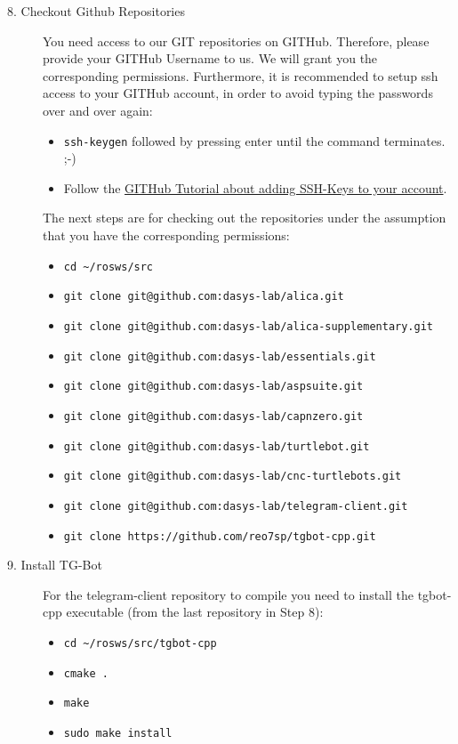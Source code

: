 \begin{description}
\begin{itemize}
	\end{itemize}
	\item[8. Checkout Github Repositories] You need access to our GIT repositories on GITHub. Therefore, please provide your GITHub Username to us. We will grant you the corresponding permissions. Furthermore, it is recommended to setup ssh access to your GITHub account, in order to avoid typing the passwords over and over again:
	\begin{itemize}
		\item \verb#ssh-keygen# followed by pressing enter until the command terminates. ;-)
		\item Follow the \href{https://help.github.com/articles/adding-a-new-ssh-key-to-your-github-account/}{GITHub Tutorial about adding SSH-Keys to your account}.
	\end{itemize}
	The next steps are for checking out the repositories under the assumption that you have the corresponding permissions:
	\begin{itemize}
		\item \verb#cd ~/rosws/src#
		\item \verb#git clone git@github.com:dasys-lab/alica.git#
		\item \verb#git clone git@github.com:dasys-lab/alica-supplementary.git#
		\item \verb#git clone git@github.com:dasys-lab/essentials.git#
		\item \verb#git clone git@github.com:dasys-lab/aspsuite.git#
		\item \verb#git clone git@github.com:dasys-lab/capnzero.git#
		\item \verb#git clone git@github.com:dasys-lab/turtlebot.git#
		\item \verb#git clone git@github.com:dasys-lab/cnc-turtlebots.git#
		\item \verb#git clone git@github.com:dasys-lab/telegram-client.git#
		\item \verb#git clone https://github.com/reo7sp/tgbot-cpp.git#
	\end{itemize}
	\item[9. Install TG-Bot] For the telegram-client repository to compile you need to install the tgbot-cpp executable (from the last repository in Step 8):
	\begin{itemize}
		\item \verb#cd ~/rosws/src/tgbot-cpp#
		\item \verb#cmake .#
		\item \verb#make#
		\item \verb#sudo make install#

\end{itemize}
\end{description}
